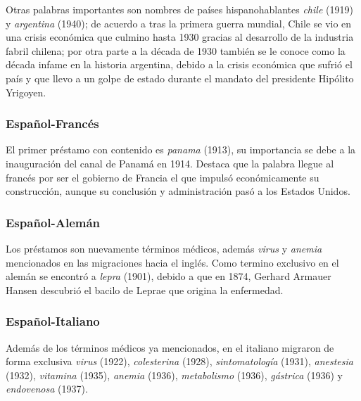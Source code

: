 Otras palabras importantes son nombres de países hispanohablantes \textit{chile} (1919) y \textit{argentina} (1940); de acuerdo a \cite{crisis_chile} tras la primera guerra mundial, Chile se vio en una crisis económica  que culmino hasta 1930 gracias al desarrollo de la industria fabril chilena; por otra parte a la década de 1930 también se le conoce como la década infame en la historia argentina, debido a la crisis económica que sufrió el país  y que llevo a un golpe de estado durante el mandato del presidente Hipólito Yrigoyen. 

\subsubsection*{Español-Francés}%

El primer préstamo con contenido es \textit{panama} (1913), su importancia se debe a la inauguración del canal de Panamá en 1914. Destaca que la palabra llegue al francés por ser el gobierno de Francia el que impulsó económicamente su construcción, aunque su conclusión y administración pasó a los Estados Unidos.  




\subsubsection*{Español-Alemán}


Los préstamos son nuevamente términos médicos, además \textit{virus} y \textit{anemia} mencionados en las migraciones hacia el inglés. Como termino exclusivo en el alemán  se encontró a \textit{lepra} (1901), debido a que en 1874, Gerhard Armauer Hansen descubrió el bacilo de Leprae que origina la enfermedad.



\subsubsection*{Español-Italiano}%

Además de los términos médicos ya mencionados, en el italiano migraron de forma  exclusiva  \textit{virus} (1922), \textit{colesterina} (1928),  \textit{sintomatología} (1931), \textit{anestesia} (1932), \textit{vitamina} (1935), \textit{anemia} (1936), \textit{metabolismo} (1936),  \textit{gástrica} (1936)  y \textit{endovenosa} (1937).  

